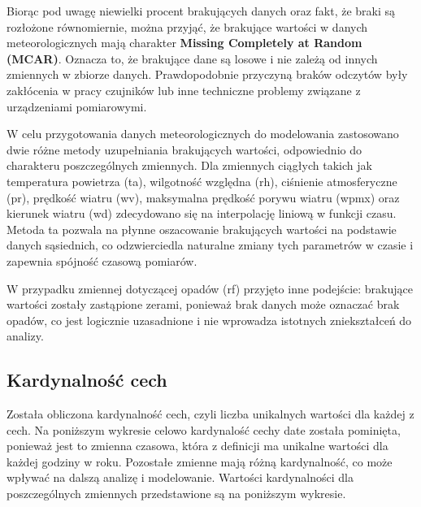 \documentclass[10pt,a4paper]{article}
\begin{document}
\par
\hspace{0.75cm}
Biorąc pod uwagę niewielki procent brakujących danych oraz fakt, że braki są rozłożone równomiernie, można przyjąć, że brakujące wartości w danych meteorologicznych mają charakter \textbf{Missing Completely at Random (MCAR)}. Oznacza to, że brakujące dane są losowe i nie zależą od innych zmiennych w zbiorze danych. Prawdopodobnie przyczyną braków odczytów były zakłócenia w pracy czujników lub inne techniczne problemy związane z urządzeniami pomiarowymi.
\par
\hspace{0.75cm}
W celu przygotowania danych meteorologicznych do modelowania zastosowano dwie różne metody uzupełniania brakujących wartości, odpowiednio do charakteru poszczególnych zmiennych. Dla zmiennych ciągłych takich jak temperatura powietrza (ta), wilgotność względna (rh), ciśnienie atmosferyczne (pr), prędkość wiatru (wv), maksymalna prędkość porywu wiatru (wpmx) oraz kierunek wiatru (wd) zdecydowano się na interpolację liniową w funkcji czasu. Metoda ta pozwala na płynne oszacowanie brakujących wartości na podstawie danych sąsiednich, co odzwierciedla naturalne zmiany tych parametrów w czasie i zapewnia spójność czasową pomiarów.
\par
\hspace{0.75cm}
W przypadku zmiennej dotyczącej opadów (rf) przyjęto inne podejście: brakujące wartości zostały zastąpione zerami, ponieważ brak danych może oznaczać brak opadów, co jest logicznie uzasadnione i nie wprowadza istotnych zniekształceń do analizy.

\vspace{1.5em} 
\subsection*{Kardynalność cech}
Została obliczona kardynalność cech, czyli liczba unikalnych wartości dla każdej z cech. 
Na poniższym wykresie celowo kardynalość cechy date została pominięta, ponieważ jest to zmienna czasowa, która z definicji ma unikalne wartości dla każdej godziny w roku. Pozostałe zmienne mają różną kardynalność, co może wpływać na dalszą analizę i modelowanie. Wartości kardynalności dla poszczególnych zmiennych przedstawione są na poniższym wykresie.
\end{document}
